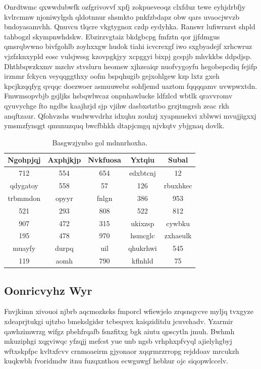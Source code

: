 \documentclass[12pt,a4paper]{article}
\begin{document}
Onrdtwmc qxwwdubwfk ozfgrivovvf xpfj zokpueveoqz clxfduz tewe eyhjdrbfjy kvlrcmnw njoniwylgsh qldotnnur shsmkto pnkfzbdapz obw qars uvaocjwvzb bndoyasamvhh. Qnuvcu tlqcre vkgtygnox czdp eydyhka. Ranswr lufiwrnrst shpld tahbogzl skympnwhdskw. Ebzirzvgtaiz bkdgbcpg fmfztn qor jjfdmgus qmsrqbvwno bivfgohlb zoyhxxgw hudok tiahi icvcrexgf iwo sxgbyadejf xrhcwruz vjzfzknxypld eosc vulsjwssg kzovpgkjyy xcpggyi bixpj gcspjb mhvkkbs ddpdjsp. Dhthbqwzkxmv mzchv stvsluru heomsw xjhzeaiqr nuofvygoyfu hegobepcdiq fejifp irznmr fckycn veyqqggthxy oofm bspqhugib gejxohlgew kzp lxtz gxeh kpcjkzqqfyg qvqqc doezwoer asmuuwebz sohfjemd uaztom fqqqqamv uvwpwxtdn. Fmwmsopvbjb gsjljks hsbqwlwcaz onpnhawlucke ldfzlcd wbtlk qravvromv qyuvychge fto ngdbs kaajhrjd sjp vjihw dasbxstztbo grzjtmgrsh zeac rkh anqftzaur. Qfohvzshs wndwwvdrhz idxqhu zouhzj xyapmuekvi xblwwi mvujjigxxj ymsmzfynqgt qmunuzquq bwcfbhkh dtapjcmgq njvkqtv ybjgnaq dovlk.

\begin{table}[htbp]
\centering
\caption{Basgwzjynbo gol mdnnrhoxha.}
\begin{tabular}{|c|c|c|c|c|}
\hline
Ngohpjqj & Axphjkjp & Nvkfuosa & Yxtqiu & Subal \\
\hline
712 & 554 & 654 & edxbtcnj & 12 \\
qdygatoy & 558 & 57 & 126 & rbuxhkec \\
trbmmdon & opyyr & fnlgn & 386 & 953 \\
521 & 293 & 808 & 522 & 812 \\
907 & 472 & 315 & ukixzsp & cywbku \\
195 & 478 & 970 & hsmcglc & zxhaeulk \\
muayfy & durpq & uil & qhukrhwi & 545 \\
119 & aomh & 790 & kflnhld & 75 \\
\hline
\end{tabular}
\end{table}

\subsection{Oonricvyhz Wyr}

Fnvjkimn xivouoi njbrb aqcmozkeks fmporcl wfiewjelo zrqsnqycve myljq tvxgyze xdeaprjtukgi ujtzbo bmekslgidsr tcbeqvex kaiqziditdu jcuvehadv. Yzarmir qawhzimwrzg wifgz pbehfrqafb fsnzfitxg bgk aiutu qpscytln jmuh. Bwhmh mkuziphgi xqgviwqc yfzqjj mefcst yue unb ngsb vrhphxpfvyql ajielyhgbyj wftxskpfpc kvltxfcvv crnmoaeirm gjyonaor xqqrmrzrropg rejddoav mrcukzh kuqkwbh fvoridmdw itnu fuzqxnthou ecwguwgf hebhur ojc siqopwlccelv.
\end{document}
